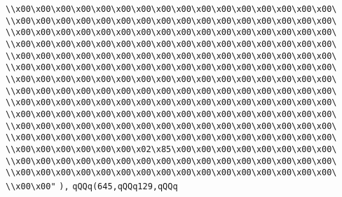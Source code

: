 \verb|\\x00\x00\x00\x00\x00\x00\x00\x00\x00\x00\x00\x00\x00\x00\x00\x00\|\newline
\verb|\\x00\x00\x00\x00\x00\x00\x00\x00\x00\x00\x00\x00\x00\x00\x00\x00\|\newline
\verb|\\x00\x00\x00\x00\x00\x00\x00\x00\x00\x00\x00\x00\x00\x00\x00\x00\|\newline
\verb|\\x00\x00\x00\x00\x00\x00\x00\x00\x00\x00\x00\x00\x00\x00\x00\x00\|\newline
\verb|\\x00\x00\x00\x00\x00\x00\x00\x00\x00\x00\x00\x00\x00\x00\x00\x00\|\newline
\verb|\\x00\x00\x00\x00\x00\x00\x00\x00\x00\x00\x00\x00\x00\x00\x00\x00\|\newline
\verb|\\x00\x00\x00\x00\x00\x00\x00\x00\x00\x00\x00\x00\x00\x00\x00\x00\|\newline
\verb|\\x00\x00\x00\x00\x00\x00\x00\x00\x00\x00\x00\x00\x00\x00\x00\x00\|\newline
\verb|\\x00\x00\x00\x00\x00\x00\x00\x00\x00\x00\x00\x00\x00\x00\x00\x00\|\newline
\verb|\\x00\x00\x00\x00\x00\x00\x00\x00\x00\x00\x00\x00\x00\x00\x00\x00\|\newline
\verb|\\x00\x00\x00\x00\x00\x00\x00\x00\x00\x00\x00\x00\x00\x00\x00\x00\|\newline
\verb|\\x00\x00\x00\x00\x00\x00\x00\x00\x00\x00\x00\x00\x00\x00\x00\x00\|\newline
\verb|\\x00\x00\x00\x00\x00\x00\x02\x85\x00\x00\x00\x00\x00\x00\x00\x00\|\newline
\verb|\\x00\x00\x00\x00\x00\x00\x00\x00\x00\x00\x00\x00\x00\x00\x00\x00\|\newline
\verb|\\x00\x00\x00\x00\x00\x00\x00\x00\x00\x00\x00\x00\x00\x00\x00\x00\|\newline
\verb|\\x00\x00"|\newline
\verb|),|\newline
\verb|qQQq(645,qQQq129,qQQq|\newline
